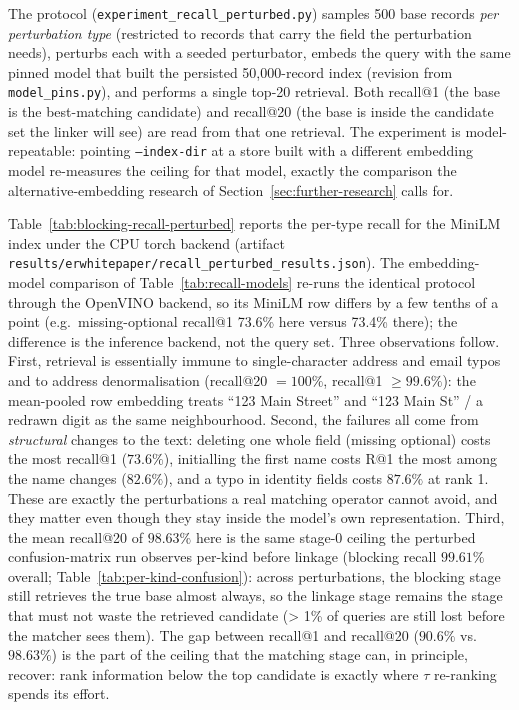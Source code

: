 \documentclass[11pt]{article}
\begin{document}
The protocol (\texttt{experiment\_recall\_perturbed.py}) samples 500 base records \emph{per perturbation type} (restricted to records that carry the field the perturbation needs), perturbs each with a seeded perturbator, embeds the query with the same pinned model that built the persisted 50{,}000-record index (revision from \texttt{model\_pins.py}), and performs a single top-20 retrieval. Both recall@1 (the base is the best-matching candidate) and recall@20 (the base is inside the candidate set the linker will see) are read from that one retrieval. The experiment is model-repeatable: pointing \texttt{--index-dir} at a store built with a different embedding model re-measures the ceiling for that model, exactly the comparison the alternative-embedding research of Section~\ref{sec:further-research} calls for.

Table~\ref{tab:blocking-recall-perturbed} reports the per-type recall for the MiniLM index under the CPU torch backend (artifact \texttt{results/erwhitepaper/recall\_perturbed\_results.json}). The embedding-model comparison of Table~\ref{tab:recall-models} re-runs the identical protocol through the OpenVINO backend, so its MiniLM row differs by a few tenths of a point (e.g.\ missing-optional recall@1 73.6\% here versus 73.4\% there); the difference is the inference backend, not the query set. Three observations follow. First, retrieval is essentially immune to single-character address and email typos and to address denormalisation (recall@20 $=100\%$, recall@1 $\geq 99.6\%$): the mean-pooled row embedding treats ``123 Main Street'' and ``123 Main St'' / a redrawn digit as the same neighbourhood. Second, the failures all come from \emph{structural} changes to the text: deleting one whole field (missing optional) costs the most recall@1 ($73.6\%$), initialling the first name costs R@1 the most among the name changes ($82.6\%$), and a typo in identity fields costs $87.6\%$ at rank 1. These are exactly the perturbations a real matching operator cannot avoid, and they matter even though they stay inside the model's own representation. Third, the mean recall@20 of $98.63\%$ here is the same stage-0 ceiling the perturbed confusion-matrix run observes per-kind before linkage (blocking recall $99.61\%$ overall; Table~\ref{tab:per-kind-confusion}): across perturbations, the blocking stage still retrieves the true base almost always, so the linkage stage remains the stage that must not waste the retrieved candidate (> 1\% of queries are still lost before the matcher sees them). The gap between recall@1 and recall@20 ($90.6\%$ vs.\ $98.63\%$) is the part of the ceiling that the matching stage can, in principle, recover: rank information below the top candidate is exactly where $\tau$ re-ranking spends its effort.
\end{document}
